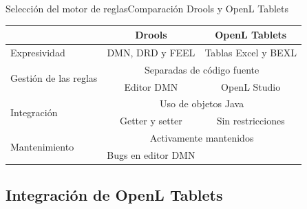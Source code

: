 \documentclass[10pt]{beamer}
\begin{document}
\begin{frame}{Selección del motor de reglas}{Comparación Drools y OpenL Tablets}
    \begin{table}
        \centering
        \def\arraystretch{1.5}
        \begin{tabular}{|l|c|c|}
            \hline & Drools & OpenL Tablets \\\hline
            Expresividad & DMN, DRD y FEEL & Tablas Excel y BEXL \\\hline
            \multirow{2}{*}{Gestión de las reglas} & \multicolumn{2}{c|}{Separadas de código fuente} \\\cline{2-3}
             & Editor DMN & OpenL Studio \\\hline
            \multirow{2}{*}{Integración } & \multicolumn{2}{c|}{Uso de objetos Java} \\\cline{2-3}
             & Getter y setter & Sin restricciones \\\hline
            \multirow{2}{*}{Mantenimiento} & \multicolumn{2}{c|}{Activamente mantenidos} \\\cline{2-3}
             & Bugs en editor DMN & \\\hline
        \end{tabular}
    \end{table}
\end{frame}

\subsection{Integración de OpenL Tablets}
\end{document}
